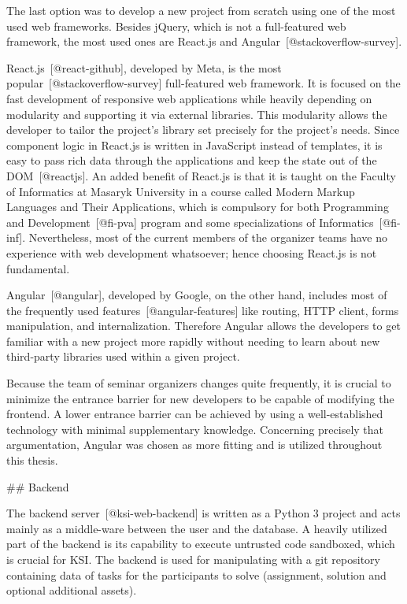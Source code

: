 \documentclass[
  digital, %
  oneside, %
  lof,     %
  nolot,     %
]{fithesis4}
\begin{document}
The last option was to develop a new project from scratch using one of the most used web frameworks. Besides jQuery, which is not a full-featured web framework, the most used ones are React.js and Angular~[@stackoverflow-survey].

React.js~[@react-github], developed by Meta, is the most popular~[@stackoverflow-survey] full-featured web framework. It is focused on the fast development of responsive web applications while heavily depending on modularity and supporting it via external libraries. This modularity allows the developer to tailor the project's library set precisely for the project's needs. Since component logic in React.js is written in JavaScript instead of templates, it is easy to pass rich data through the applications and keep the state out of the DOM~[@reactjs]. An added benefit of React.js is that it is taught on the Faculty of Informatics at Masaryk University in a course called Modern Markup Languages and Their Applications, which is compulsory for both
Programming and Development~[@fi-pva] program and some specializations of Informatics~[@fi-inf]. Nevertheless, most of the current members of the organizer teams have no experience with web development whatsoever; hence choosing React.js is not fundamental.

Angular~[@angular], developed by Google, on the other hand, includes most of the frequently used features~[@angular-features] like routing, HTTP client, forms manipulation, and internalization. Therefore Angular allows the developers to get familiar with a new project more rapidly without needing to learn about new third-party libraries used within a given project.

Because the team of seminar organizers changes quite frequently, it is crucial to minimize the entrance barrier for new developers to be capable of modifying the frontend. A lower entrance barrier can be achieved by using a well-established technology with minimal supplementary knowledge. Concerning precisely that argumentation, Angular was chosen as more fitting and is utilized throughout this thesis.

## Backend

The backend server~[@ksi-web-backend] is written as a Python 3 project and acts mainly as a middle-ware between the user and the database. A heavily utilized part of the backend is its capability to execute untrusted code sandboxed, which is crucial for KSI. The backend is used for manipulating with a git repository containing data of tasks for the participants to solve (assignment, solution and optional additional assets).
\end{document}
